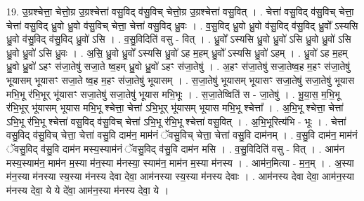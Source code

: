 \documentclass[17pt]{extarticle}
\begin{document}
19. उ॒ग्रश्चेत्ता॒ चेत्तो॒ग्र उ॒ग्रश्चेत्ता॑ वसु॒विद् व॑सु॒विच् चेत्तो॒ग्र उ॒ग्रश्चेत्ता॑ वसु॒वित् । . चेत्ता॑ वसु॒विद् व॑सु॒विच् चेत्ता॒ चेत्ता॑ वसु॒विद् ध्रु॒वो ध्रु॒वो व॑सु॒विच् चेत्ता॒ चेत्ता॑ वसु॒विद् ध्रु॒वः । . व॒सु॒विद् ध्रु॒वो ध्रु॒वो व॑सु॒विद् व॑सु॒विद् ध्रु॒वो᳚ ऽस्यसि ध्रु॒वो व॑सु॒विद् व॑सु॒विद् ध्रु॒वो॑ ऽसि । . व॒सु॒विदिति॑ वसु - वित् । . ध्रु॒वो᳚ ऽस्यसि ध्रु॒वो ध्रु॒वो॑ ऽसि ध्रु॒वो ध्रु॒वो॑ ऽसि ध्रु॒वो ध्रु॒वो॑ ऽसि ध्रु॒वः । . अ॒सि॒ ध्रु॒वो ध्रु॒वो᳚ ऽस्यसि ध्रु॒वो॑ ऽह म॒हम् ध्रु॒वो᳚ ऽस्यसि ध्रु॒वो॑ ऽहम् । . ध्रु॒वो॑ ऽह म॒हम् ध्रु॒वो ध्रु॒वो॑ ऽहꣳ स॑जा॒तेषु॑ सजा॒ते ष्व॒हम् ध्रु॒वो ध्रु॒वो॑ ऽहꣳ स॑जा॒तेषु॑ । . अ॒हꣳ स॑जा॒तेषु॑ सजा॒तेष्व॒ह म॒हꣳ स॑जा॒तेषु॑ भूयासम् भूयासꣳ सजा॒ते ष्व॒ह म॒हꣳ स॑जा॒तेषु॑ भूयासम् । . स॒जा॒तेषु॑ भूयासम् भूयासꣳ सजा॒तेषु॑ सजा॒तेषु॑ भूयास मभि॒भू र॑भि॒भूर् भू॑यासꣳ सजा॒तेषु॑ सजा॒तेषु॑ भूयास मभि॒भूः । . स॒जा॒तेष्विति॑ स - जा॒तेषु॑ । . भू॒या॒स॒ म॒भि॒भू र॑भि॒भूर् भू॑यासम् भूयास मभि॒भू श्चेत्ता॒ चेत्ता॑ ऽभि॒भूर् भू॑यासम् भूयास मभि॒भू श्चेत्ता᳚ । . अ॒भि॒भू श्चेत्ता॒ चेत्ता॑ ऽभि॒भू र॑भि॒भू श्चेत्ता॑ वसु॒विद् व॑सु॒विच् चेत्ता॑ ऽभि॒भू र॑भि॒भू श्चेत्ता॑ वसु॒वित् । . अ॒भि॒भूरित्य॑भि - भूः । . चेत्ता॑ वसु॒विद् व॑सु॒विच् चेत्ता॒ चेत्ता॑ वसु॒वि दाम॑न॒ माम॑नं ॅवसु॒विच् चेत्ता॒ चेत्ता॑ वसु॒वि दाम॑नम् । . व॒सु॒वि दाम॑न॒ माम॑नं ॅवसु॒विद् व॑सु॒वि दाम॑न मस्य॒स्याम॑नं ॅवसु॒विद् व॑सु॒वि दाम॑न मसि । . व॒सु॒विदिति॑ वसु - वित् । . आम॑न मस्य॒स्याम॑न॒ माम॑न म॒स्या म॑न॒स्या म॑नस्या॒ स्याम॑न॒ माम॑न म॒स्या म॑नस्य । . आम॑न॒मित्या - म॒न॒म् । . अ॒स्या म॑न॒स्या म॑नस्या स्य॒स्या म॑नस्य देवा देवा॒ आम॑नस्या स्य॒स्या म॑नस्य देवाः । . आम॑नस्य देवा देवा॒ आम॑न॒स्या म॑नस्य देवा॒ ये ये दे॑वा॒ आम॑न॒स्या म॑नस्य देवा॒ ये । \newline
\end{document}
